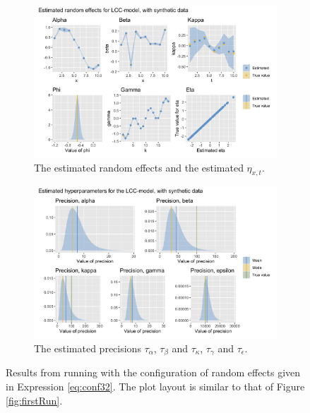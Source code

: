 \begin{figure}[h!]
    \centering
    \begin{subfigure}[b]{0.85\textwidth}
        \centering
        \includegraphics[width=\textwidth]{synthetic-data/Figures/effects-LCC-synthetic-3-2.png}
        \caption{The estimated random effects and the estimated $\eta_{x,t}$.}
        \label{fig:conf32-top}
    \end{subfigure}
    
    \begin{subfigure}[b]{0.6\textwidth}
        \centering
        \includegraphics[width=\textwidth]{synthetic-data/Figures/hyperparameters-LCC-synthetic-3-2.png}
        \caption{The estimated precisions $\tau_\alpha$, $\tau_\beta$ and $\tau_\kappa$, $\tau_\gamma$ and $\tau_\epsilon$.}
        \label{fig:conf32-bottom}
    \end{subfigure}
    \caption{Results from running \inlabru with the configuration of random effects given in Expression \ref{eq:conf32}. The plot layout is similar to that of Figure \ref{fig:firstRun}.}
    \label{fig:conf32}
\end{figure}

